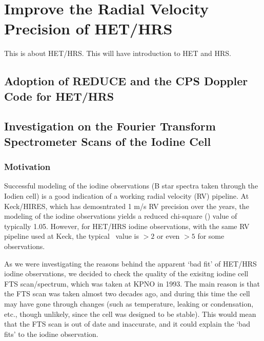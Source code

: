 \chapter{Improve the Radial Velocity Precision of HET/HRS}\label{chap:het}

This is about HET/HRS. This will have introduction to HET and HRS.

\section{Adoption of REDUCE and the CPS Doppler Code for HET/HRS}


\section{Investigation on the Fourier Transform Spectrometer Scans of the Iodine Cell}\label{het:sec:fts}

\subsection{Motivation}

Successful modeling of the iodine observations (B star spectra taken
through the Iodien cell) is a good indication of a working radial
velocity (RV) pipeline. At Keck/HIRES, which has demosntrated 1 m/s RV
precision over the years, the modeling of the iodine observations
yields a reduced chi-square (\chisq) value of typically 1.05. However,
for HET/HRS iodine observations, with the same RV pipeline used at
Keck, the typical \chisq\ value is $>2$ or even $>5$ for some
observations.

As we were investigating the reasons behind the apparent `bad fit' of
HET/HRS iodine observations, we decided to check the quality of the
exisitng iodine cell FTS scan/spectrum, which was taken at KPNO in
1993. The main reason is that the FTS scan was taken almost two
decades ago, and during this time the cell may have gone through
changes (such as temperature, leaking or condensation, etc., though
unlikely, since the cell was designed to be stable).  This would mean
that the FTS scan is out of date and inaccurate, and it could explain
the `bad fits' to the iodine observation.

